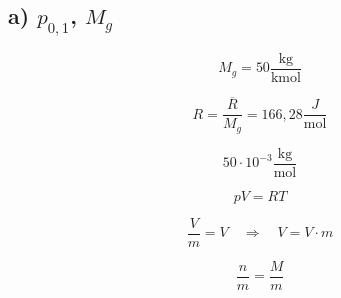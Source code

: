 \subsection*{a) $p_{0,1}$, $M_g$}

\[
M_g = 50 \frac{\text{kg}}{\text{kmol}}
\]

\[
R = \frac{\overline{R}}{M_g} = 166,28 \frac{J}{\text{mol}}
\]

\[
50 \cdot 10^{-3} \frac{\text{kg}}{\text{mol}}
\]

\[
pV = RT
\]

\[
\frac{V}{m} = V \quad \Rightarrow \quad V = V \cdot m
\]

\[
\frac{n}{m} = \frac{M}{m}
\]